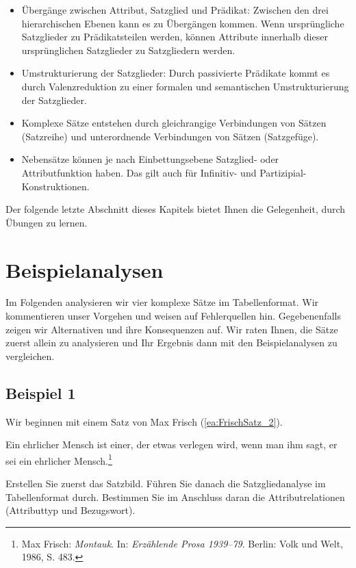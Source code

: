 \begin{itemize}
\item Übergänge zwischen Attribut, Satzglied und Prädikat: Zwischen den drei hierarchischen Ebenen kann es zu Übergängen kommen. Wenn ursprüngliche Satzglieder zu Prädikatsteilen werden, können Attribute innerhalb dieser ursprünglichen Satzglieder zu Satzgliedern werden.

\item Umstrukturierung der Satzglieder: Durch passivierte Prädikate kommt es durch Valenzreduktion zu einer formalen und semantischen Umstrukturierung der Satzglieder. 

\item Komplexe Sätze entstehen durch gleichrangige Verbindungen von Sätzen (Satzreihe) und unterordnende Verbindungen von Sätzen (Satzgefüge). 

\item Nebensätze können je nach Einbettungsebene Satzglied- oder Attributfunktion haben. Das gilt auch für Infinitiv- und Partizipial-Konstruktionen.    

\end{itemize}

Der folgende letzte Abschnitt dieses Kapitels bietet Ihnen die Gelegenheit, durch Übungen zu lernen.

\section{Beispielanalysen}\label{section:Beispielanalysen}

Im Folgenden analysieren wir vier komplexe Sätze im Tabellenformat. Wir kommentieren unser Vorgehen und weisen auf Fehlerquellen hin. Gegebenenfalls zeigen wir Alternativen und ihre Konsequenzen auf. Wir raten Ihnen, die Sätze zuerst allein zu analysieren und Ihr Ergebnis dann mit den Beispielanalysen zu vergleichen.  

\subsection{Beispiel 1}\label{subsection:Bsp1}

Wir beginnen mit einem Satz von Max Frisch (\ref{ea:FrischSatz_2}).

\ea \label{ea:FrischSatz_2} Ein ehrlicher Mensch ist einer, der etwas verlegen wird, wenn man ihm sagt, er sei ein ehrlicher Mensch.\footnote{Max Frisch: \textit{Montauk}. In: \textit{Erzählende Prosa 1939–79}. Berlin: Volk und Welt, 1986, S. 483.}
\z 

Erstellen Sie zuerst das Satzbild. Führen Sie danach die Satzgliedanalyse im Tabellenformat durch. Bestimmen Sie im Anschluss daran die Attributrelationen (Attributtyp und Bezugswort).



